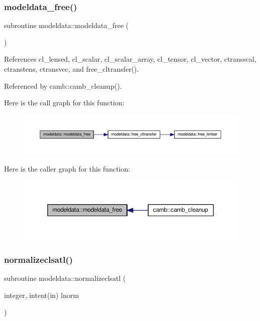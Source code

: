 \subsubsection{\texorpdfstring{modeldata\+\_\+free()}{modeldata\_free()}}
{\footnotesize\ttfamily subroutine modeldata\+::modeldata\+\_\+free (\begin{DoxyParamCaption}{ }\end{DoxyParamCaption})}



References cl\+\_\+lensed, cl\+\_\+scalar, cl\+\_\+scalar\+\_\+array, cl\+\_\+tensor, cl\+\_\+vector, ctransscal, ctranstens, ctransvec, and free\+\_\+cltransfer().



Referenced by camb\+::camb\+\_\+cleanup().

Here is the call graph for this function\+:
\nopagebreak
\begin{figure}[H]
\begin{center}
\leavevmode
\includegraphics[width=350pt]{namespacemodeldata_a4a66d258c52f2b7639e92ce04f7047ff_cgraph}
\end{center}
\end{figure}
Here is the caller graph for this function\+:
\nopagebreak
\begin{figure}[H]
\begin{center}
\leavevmode
\includegraphics[width=350pt]{namespacemodeldata_a4a66d258c52f2b7639e92ce04f7047ff_icgraph}
\end{center}
\end{figure}
\mbox{\label{namespacemodeldata_aec1c8c9bdd2a65d1f5eec6cb91f7afa1}} 
\subsubsection{\texorpdfstring{normalizeclsatl()}{normalizeclsatl()}}
{\footnotesize\ttfamily subroutine modeldata\+::normalizeclsatl (\begin{DoxyParamCaption}\item[{integer, intent(in)}]{lnorm }\end{DoxyParamCaption})}



